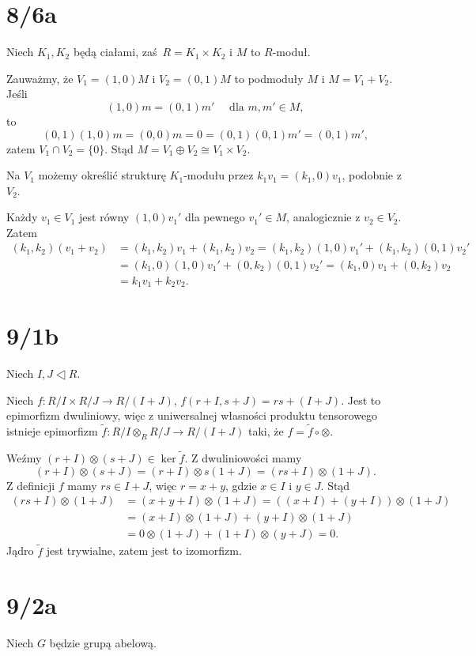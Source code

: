 \documentclass[a4paper, 12pt]{article}
\title{}
\author{Wiktor Kuchta}
\date{\vspace{-4ex}}
\newcommand{\+}{\enspace}
\begin{document}
\maketitle
\section*{8/6a}
Niech $K_1, K_2$ będą ciałami, zaś $R = K_1 × K_2$ i $M$ to $R$-moduł.

Zauważmy, że $V_1 = (1,0)M$ i $V_2 = (0,1)M$ to podmoduły $M$ i $M = V_1 + V_2$.
Jeśli
$$(1,0)m = (0,1)m' \quad \text{ dla }m, m' ∈ M,$$
to
$$(0,1)(1,0)m = (0,0)m = 0 = (0,1)(0,1)m' = (0,1)m',$$
zatem $V_1 ∩ V_2 = \{ 0 \}$.
Stąd $M = V_1 ⊕ V_2 ≅ V_1 × V_2$.

Na $V_1$ możemy określić strukturę $K_1$-modułu
przez $k_1 v_1 = (k_1,0)v_1$, podobnie z $V_2$.

Każdy $v_1∈V_1$ jest równy $(1,0)v_1'$ dla pewnego $v_1' ∈ M$,
analogicznie z $v_2 ∈ V_2$.
Zatem
\begin{align*}
(k_1, k_2)(v_1 + v_2)
&= (k_1,k_2)v_1 + (k_1,k_2)v_2
= (k_1,k_2)(1,0)v_1' + (k_1,k_2)(0,1)v_2' \\
&= (k_1,0)(1,0)v_1' + (0,k_2)(0,1)v_2'
= (k_1,0)v_1 + (0,k_2)v_2 \\
&= k_1v_1 + k_2v_2.
\end{align*}


\section*{9/1b}
Niech $I,J ◁ R$.

Niech
$f: R/I × R/J → R/(I+J)$,
$f(r+I,s+J) = rs + (I + J)$.
Jest to epimorfizm dwuliniowy,
więc z uniwersalnej własności produktu tensorowego
istnieje epimorfizm $\tilde{f}: R/I ⊗_R R/J → R/(I+J)$
taki,
że $f = \tilde{f} ∘ ⊗$.

Weźmy $(r+I)⊗(s+J) ∈ \ker \tilde{f}$.
Z dwuliniowości mamy
$$(r+I)⊗(s+J) = (r+I)⊗s(1+J) = (rs+I)⊗(1+J).$$
Z definicji $f$ mamy $rs ∈ I+J$, więc $r = x+y$,
gdzie $x∈I$ i $y ∈ J$.
Stąd
\begin{align*}
	(rs+I)⊗(1+J) &= (x+y+I)⊗(1+J) = ((x+I)+(y+I))⊗(1+J) \\
				 &= (x+I)⊗(1+J)+(y+I)⊗(1+J) \\
				 &= 0⊗(1+J) + (1+I)⊗(y+J) = 0.
\end{align*}
Jądro $\tilde{f}$ jest trywialne, zatem jest to izomorfizm.

\section*{9/2a}
Niech $G$ będzie grupą abelową.
\end{document}
